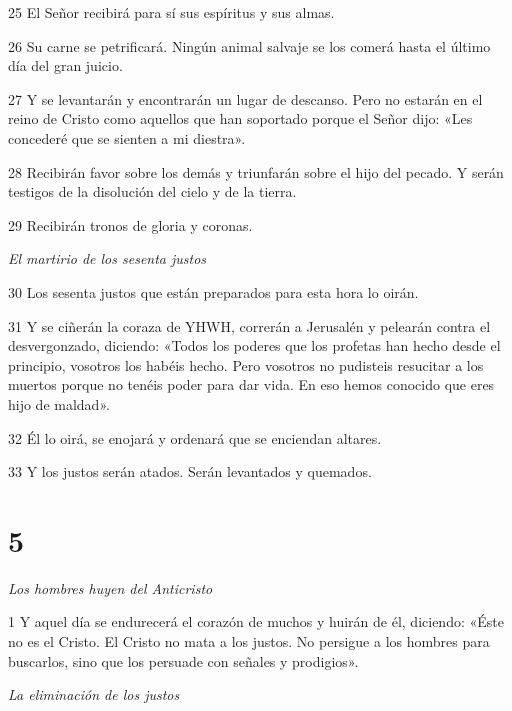 \par 25 El Señor recibirá para sí sus espíritus y sus almas.

\par 26 Su carne se petrificará. Ningún animal salvaje se los comerá hasta el último día del gran juicio.

\par 27 Y se levantarán y encontrarán un lugar de descanso. Pero no estarán en el reino de Cristo como aquellos que han soportado porque el Señor dijo: «Les concederé que se sienten a mi diestra».

\par 28 Recibirán favor sobre los demás y triunfarán sobre el hijo del pecado. Y serán testigos de la disolución del cielo y de la tierra.

\par 29 Recibirán tronos de gloria y coronas.


\par \textit{El martirio de los sesenta justos}


\par 30 Los sesenta justos que están preparados para esta hora lo oirán.

\par 31 Y se ciñerán la coraza de YHWH, correrán a Jerusalén y pelearán contra el desvergonzado, diciendo: «Todos los poderes que los profetas han hecho desde el principio, vosotros los habéis hecho. Pero vosotros no pudisteis resucitar a los muertos porque no tenéis poder para dar vida. En eso hemos conocido que eres hijo de maldad».

\par 32 Él lo oirá, se enojará y ordenará que se enciendan altares.

\par 33 Y los justos serán atados. Serán levantados y quemados.

\chapter{5}

\par \textit{Los hombres huyen del Anticristo}

\par 1 Y aquel día se endurecerá el corazón de muchos y huirán de él, diciendo: «Éste no es el Cristo. El Cristo no mata a los justos. No persigue a los hombres para buscarlos, sino que los persuade con señales y prodigios».

\par \textit{La eliminación de los justos}

